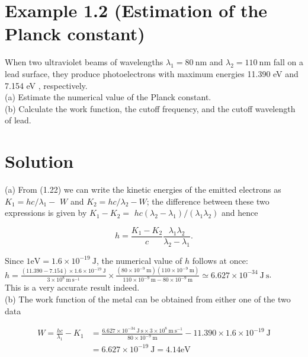 \documentclass[10pt]{article}
\begin{document}
\section*{Example 1.2 (Estimation of the Planck constant)}
When two ultraviolet beams of wavelengths $\lambda_{1}=80 \mathrm{~nm}$ and $\lambda_{2}=110 \mathrm{~nm}$ fall on a lead surface, they produce photoelectrons with maximum energies 11.390 eV and 7.154 eV , respectively.\\
(a) Estimate the numerical value of the Planck constant.\\
(b) Calculate the work function, the cutoff frequency, and the cutoff wavelength of lead.

\section*{Solution}
(a) From (1.22) we can write the kinetic energies of the emitted electrons as $K_{1}=h c / \lambda_{1}-$ $W$ and $K_{2}=h c / \lambda_{2}-W$; the difference between these two expressions is given by $K_{1}-K_{2}=$ $h c\left(\lambda_{2}-\lambda_{1}\right) /\left(\lambda_{1} \lambda_{2}\right)$ and hence


\begin{equation*}
h=\frac{K_{1}-K_{2}}{c} \frac{\lambda_{1} \lambda_{2}}{\lambda_{2}-\lambda_{1}} . \tag{1.24}
\end{equation*}


Since $1 \mathrm{eV}=1.6 \times 10^{-19} \mathrm{~J}$, the numerical value of $h$ follows at once:\\
$h=\frac{(11.390-7.154) \times 1.6 \times 10^{-19} \mathrm{~J}}{3 \times 10^{8} \mathrm{~m} \mathrm{~s}^{-1}} \times \frac{\left(80 \times 10^{-9} \mathrm{~m}\right)\left(110 \times 10^{-9} \mathrm{~m}\right)}{110 \times 10^{-9} \mathrm{~m}-80 \times 10^{-9} \mathrm{~m}} \simeq 6.627 \times 10^{-34} \mathrm{~J} \mathrm{~s}$.\\
This is a very accurate result indeed.\\
(b) The work function of the metal can be obtained from either one of the two data


\begin{align*}
W=\frac{h c}{\lambda_{1}}-K_{1} & =\frac{6.627 \times 10^{-34} \mathrm{~J} \mathrm{~s} \times 3 \times 10^{8} \mathrm{~m} \mathrm{~s}^{-1}}{80 \times 10^{-9} \mathrm{~m}}-11.390 \times 1.6 \times 10^{-19} \mathrm{~J} \\
& =6.627 \times 10^{-19} \mathrm{~J}=4.14 \mathrm{eV} \tag{1.26}
\end{align*}
\end{document}
